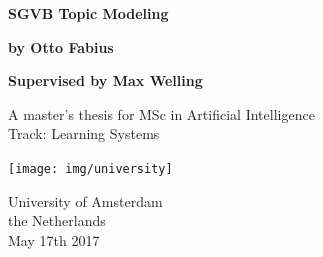 \documentclass{report}
\begin{document}
\large
\doublespacing

\begin{titlepage}
	\begin{center}
		\vspace*{1cm}
		
		\textbf{{\fontsize{5cm}{5.5cm}\selectfont SGVB Topic Modeling}}
		
		\vspace{0.5cm}
		
		
		\vspace{1.5cm}
		
		\textbf{by Otto Fabius} \\
		
		\vspace{1.5cm}
		
		\textbf{Supervised by Max Welling} \\
		
		\vfill
		
		A master's thesis for MSc in Artificial Intelligence \\
		Track: Learning Systems
		
		\vspace{0.8cm}
		
		\texttt{[image: img/university]}
		
		University of Amsterdam\\
		the Netherlands\\
		May 17th 2017
		
	\end{center}
\end{titlepage}
\end{document}
